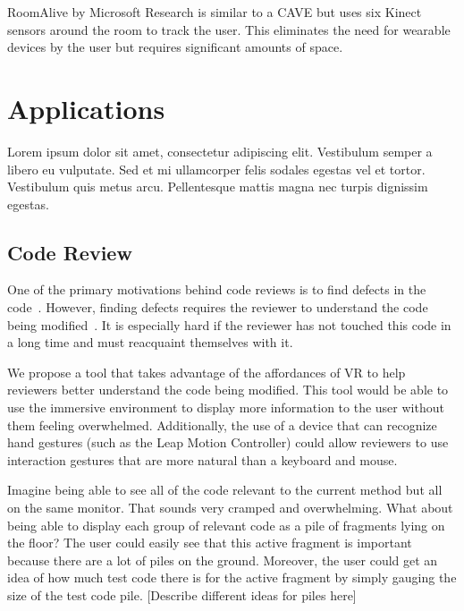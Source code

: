 \documentclass{acm_proc_article-sp}
\begin{document}
RoomAlive by Microsoft Research is similar to a CAVE but uses six Kinect sensors around the room to track the user.  This eliminates the need for wearable devices by the user but requires significant amounts of space.

\section{Applications}
Lorem ipsum dolor sit amet, consectetur adipiscing elit. Vestibulum semper a libero eu vulputate. Sed et mi ullamcorper felis sodales egestas vel et tortor. Vestibulum quis metus arcu. Pellentesque mattis magna nec turpis dignissim egestas. 

\subsection{Code Review}
One of the primary motivations behind code reviews is to find defects in the code~\cite{bacchelli:ModernCodeReviewChallenges}. However, finding defects requires the reviewer to understand the code being modified~\cite{bacchelli:ModernCodeReviewChallenges}. It is especially hard if the reviewer has not touched this code in a long time and must reacquaint themselves with it.

We propose a tool that takes advantage of the affordances of VR to help reviewers better understand the code being modified. This tool would be able to use the immersive environment to display more information to the user without them feeling overwhelmed. Additionally, the use of a device that can recognize hand gestures (such as the Leap Motion Controller) could allow reviewers to use interaction gestures that are more natural than a keyboard and mouse. 

    
 Imagine being able to see all of the code relevant to the current method but all on the same monitor. That sounds very cramped and overwhelming. What about being able to display each group of relevant code as a pile of fragments lying on the floor? The user could easily see that this active fragment is important because there are a lot of piles on the ground. Moreover, the user could get an idea of how much test code there is for the active fragment by simply gauging the size of the test code pile. [Describe different ideas for piles here]
 
\end{document}

